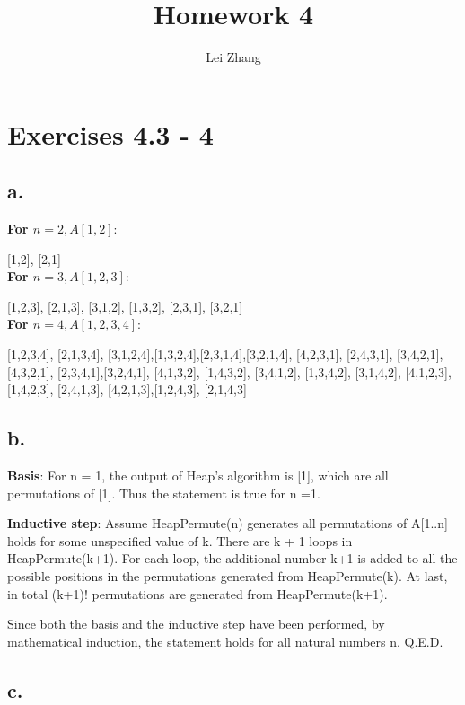 \documentclass{article}
\title{Homework 4}
\author{Lei Zhang}
\begin{document}
\maketitle

\section{Exercises 4.3 - 4}

\subsection*{a. }

\textbf{For $n=2, A[1,2]$}: 

[1,2], [2,1]\\

\textbf{For $n=3, A[1,2,3]$}: 

[1,2,3], [2,1,3], [3,1,2], [1,3,2], [2,3,1], [3,2,1]\\

\textbf{For $n=4, A[1,2,3,4]$}: 

[1,2,3,4], [2,1,3,4], [3,1,2,4],[1,3,2,4],[2,3,1,4],[3,2,1,4], [4,2,3,1], [2,4,3,1], [3,4,2,1], [4,3,2,1], [2,3,4,1],[3,2,4,1], [4,1,3,2], [1,4,3,2], [3,4,1,2], [1,3,4,2], [3,1,4,2], [4,1,2,3],[1,4,2,3], [2,4,1,3], [4,2,1,3],[1,2,4,3], [2,1,4,3]

\subsection*{b. }

\textbf{Basis}: For n = 1, the output of Heap's algorithm is [1], which are all permutations of [1]. Thus the statement is true for n =1. 

\textbf{Inductive step}: Assume HeapPermute(n) generates all permutations of A[1..n] holds for some unspecified value of k. There are k + 1 loops in HeapPermute(k+1). For each loop, the additional number k+1 is added to all the possible positions in the permutations generated from  HeapPermute(k). At last, in total (k+1)! permutations are generated from HeapPermute(k+1). 

Since both the basis and the inductive step have been performed, by mathematical induction, the statement holds for all natural numbers n. Q.E.D.

\subsection*{c. }
\end{document}
